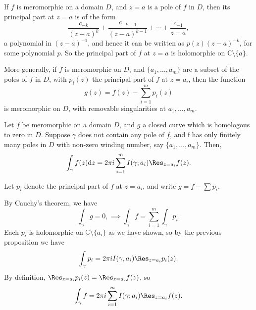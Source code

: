 \documentclass[12pt]{article}
\begin{document}
If $f$ is meromorphic on a domain $D$, and $z = a$ is a pole of $f$ in $D$, then its principal part at $z = a$ is of the form
\[
	\frac{c_{-k}}{(z-a)^k} + \frac{c_{-k+1}}{(z-a)^{k-1}} + \cdots + \frac{c_{-1}}{z-a},
\]
a polynomial in $(z-a)^{-1}$, and hence it can be written as $p(z) (z-a)^{-k}$, for some polynomial $p$. So the principal part of $f$ at $z = a$ is holomorphic on $\mathbb{C} \setminus \{a\}$.

More generally, if $f$ is meromorphic on $D$, and $\{a_1, \ldots, a_m\}$ are a subset of the poles of $f$ in $D$, with $p_i(z)$ the principal part of $f$ at $z = a_i$, then the function
\[
	g(z) = f(z) - \sum_{i=1}^m p_i(z)
\]
is meromorphic on $D$, with removable singularities at $a_1, \ldots, a_m$.

\begin{theorem}
	Let $f$ be meromorphic on a domain $D$, and $g$ a closed curve which is homologous to zero in $D$. Suppose $\gamma$ does not contain any pole of $f$, and f has only finitely many poles in $D$ with non-zero winding number, say $\{a_1, \ldots, a_m\}$. Then,
	\[
		\int_\gamma f(z) \mathrm dz = 2 \pi i \sum_{i=1}^m I(\gamma; a_i) \Res_{z=a_i} f(z).
	\]
\end{theorem}

\begin{proofbox}
	Let $p_i$ denote the principal part of $f$ at $z = a_i$, and write $g = f - \sum p_i$.

	By Cauchy's theorem, we have
	\[
		\int_\gamma g = 0, \implies \int_\gamma f = \sum_{i=1}^m \int_\gamma p_i.
	\]
	Each $p_i$ is holomorphic on $\mathbb{C} \setminus \{a_i\}$ as we have shown, so by the previous proposition we have
	\[
		\int_\gamma p_i = 2 \pi i I(\gamma, a_i) \Res_{z=a_i} p_i(z).
	\]
	By definition, $\Res_{z=a_i} p_i(z) = \Res_{z=a_i} f(z)$, so
	\[
		\int_\gamma f = 2 \pi i \sum_{i=1}^m I(\gamma; a_i) \Res_{z=a_i} f(z).
	\]
\end{proofbox}
\end{document}
